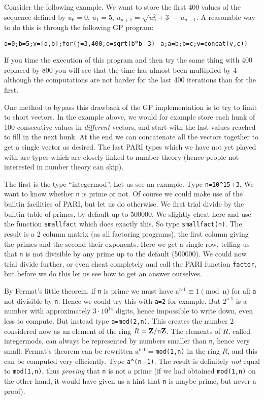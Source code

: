 Consider the following example. We want to store the first 400 values of the
sequence defined by $u_0=0$, $u_1=5$, $u_{n+1}=\sqrt{u_n^2+3}\,-\,u_{n-1}$.
A reasonable way to do this is through the following GP program:

{\tt a=0;b=5;v=[a,b];for(j=3,400,c=sqrt(b$*$b$+$3)$-$a;a=b;b=c;v=concat(v,c))}

If you time the execution of this program and then try the same thing with
400 replaced by 800 you will see that the time has almost been multiplied by
4 although the computations are not harder for the last 400 iterations than for
the first.

One method to bypass this drawback of the GP implementation is to try to limit
to short vectors. In the example above, we would for example store each hunk of
100 consecutive values in {\it different} vectors, and start with the last 
values reached to fill in the next hunk. At the end we can concatenate all the
vectors together to get a single vector as desired.
\medskip
The last PARI types which we have not yet played with are types which are
closely linked to number theory (hence people not interested in number theory
can skip).

The first is the type ``integermod''. Let us see an example. Type
{\tt n=10\^{}15$+$3}. We want to know whether {\tt n} is prime or not. Of course
we could make use of the builtin facilities of PARI, but let us do otherwise.
We first trial divide by the builtin table of primes, by default up to
500000. We slightly cheat here and use the function {\tt smallfact} which
does exactly this. So type {\tt smallfact(n)}. The result is a 2 column
matrix (as all factoring programs), the first column giving the primes and
the second their exponents. Here we get a single row, telling us that {\tt n}
is not divisible by any prime up to the default (500000). We could now
trial divide further, or even cheat completely and call the PARI function
{\tt factor}, but before we do this let us see how to get an answer ourselves.

By Fermat's little theorem, if {\tt n} is prime we must have 
$\text{a}^{\text{n-1}}\equiv1\pmod{\text{n}}$ for all {\tt a} not divisible by
{\tt n}. Hence we could try this with {\tt a=2} for example. But 
$2^{\text{n-1}}$ is a number with approximately $3\cdot10^{14}$ digits, hence
impossible to write down, even less to compute. But instead type
{\tt a=mod(2,n)}. This creates the number 2 considered now as an element of
the ring $R={\bf Z}/{\rm n}{\bf Z}$. The elements of $R$, called integermods, can
always be represented by numbers smaller than {\tt n}, hence very small.
Fermat's theorem can be rewritten {\tt $\text{a}^{\text{n-1}}=$mod(1,n)} in
the ring $R$, and this can be computed very efficiently. Type
{\tt a\^{}(n$-$1)}. The result is definitely {\sl not\/} equal to {\tt mod(1,n)},
thus {\sl proving\/} that {\tt n} is not a prime (if we had obtained 
{\tt mod(1,n)} on the other hand, it would have given us a hint that {\tt n}
is maybe prime, but never a proof).

